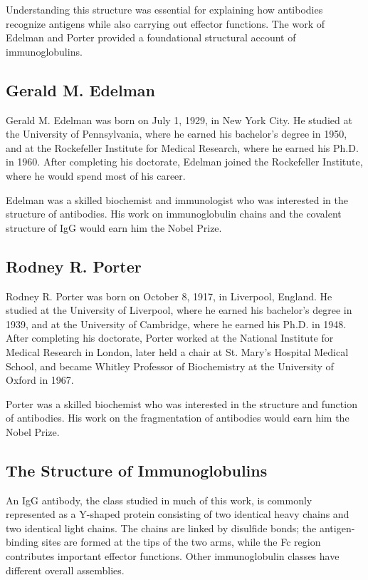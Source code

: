 Understanding this structure was essential for explaining how antibodies recognize antigens while also carrying out effector functions. The work of Edelman and Porter provided a foundational structural account of immunoglobulins.

\subsection{Gerald M. Edelman}

Gerald M. Edelman was born on July 1, 1929, in New York City. He studied at the University of Pennsylvania, where he earned his bachelor's degree in 1950, and at the Rockefeller Institute for Medical Research, where he earned his Ph.D. in 1960. After completing his doctorate, Edelman joined the Rockefeller Institute, where he would spend most of his career.

Edelman was a skilled biochemist and immunologist who was interested in the structure of antibodies. His work on immunoglobulin chains and the covalent structure of IgG would earn him the Nobel Prize.

\subsection{Rodney R. Porter}

Rodney R. Porter was born on October 8, 1917, in Liverpool, England. He studied at the University of Liverpool, where he earned his bachelor's degree in 1939, and at the University of Cambridge, where he earned his Ph.D. in 1948. After completing his doctorate, Porter worked at the National Institute for Medical Research in London, later held a chair at St. Mary's Hospital Medical School, and became Whitley Professor of Biochemistry at the University of Oxford in 1967.

Porter was a skilled biochemist who was interested in the structure and function of antibodies. His work on the fragmentation of antibodies would earn him the Nobel Prize.

\subsection{The Structure of Immunoglobulins}

An IgG antibody, the class studied in much of this work, is commonly represented as a Y-shaped protein consisting of two identical heavy chains and two identical light chains. The chains are linked by disulfide bonds; the antigen-binding sites are formed at the tips of the two arms, while the Fc region contributes important effector functions. Other immunoglobulin classes have different overall assemblies.


